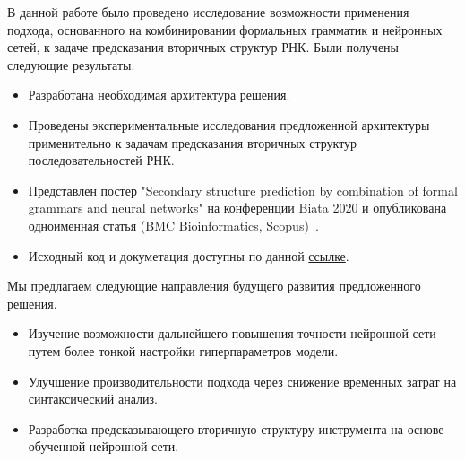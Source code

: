 В данной работе было проведено исследование возможности применения подхода, основанного на комбинировании формальных грамматик и нейронных сетей, к задаче предсказания вторичных структур РНК. Были получены следующие результаты.
\begin{itemize}
    \item Разработана необходимая архитектура решения.
    \item Проведены экспериментальные исследования предложенной архитектуры применительно к задачам предсказания вторичных структур последовательностей РНК.
    \item Представлен постер "Secondary structure prediction by combination
of formal grammars and neural networks" на конференции Biata 2020 и опубликована одноименная статья (BMC Bioinformatics, Scopus)~\cite{grigorev2020secondary}.
    \item Исходный код и докуметация доступны по данной \href{https://github.com/LuninaPolina/SecondaryStructureAnalyzer}{ссылке}.
\end{itemize}

Мы предлагаем следующие направления будущего развития предложенного решения.
\begin{itemize}
    \item Изучение возможности дальнейшего повышения точности нейронной сети путем более тонкой настройки гиперпараметров модели. 
    \item Улучшение производительности подхода через снижение временных затрат на синтаксический анализ.
    \item Разработка предсказывающего вторичную структуру инструмента на основе обученной нейронной сети.
\end{itemize}